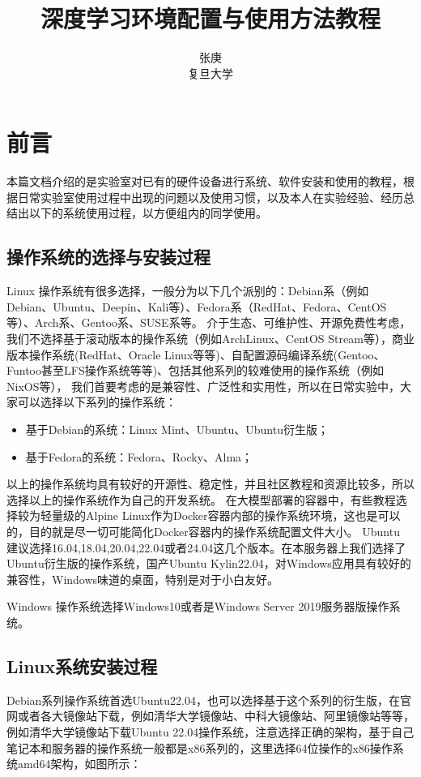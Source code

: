 \documentclass[lang=cn,a4paper,newtx]{elegantpaper}
\title{深度学习环境配置与使用方法教程}
\author{张庚 \\ 复旦大学}
\institute{知识工场实验室}
\date{\zhdate{2023/12/24}}
\begin{document}
\maketitle

\tableofcontents
\newpage

\section{前言}
本篇文档介绍的是实验室对已有的硬件设备进行系统、软件安装和使用的教程，根据日常实验室使用过程中出现的问题以及使用习惯，以及本人在实验经验、经历总结出以下的系统使用过程，以方便组内的同学使用。

\subsection{操作系统的选择与安装过程}
Linux 操作系统有很多选择，一般分为以下几个派别的：Debian系（例如Debian、Ubuntu、Deepin、Kali等）、Fedora系（RedHat、Fedora、CentOS等）、Arch系、Gentoo系、SUSE系等。
介于生态、可维护性、开源免费性考虑，我们不选择基于滚动版本的操作系统（例如ArchLinux、CentOS Stream等），商业版本操作系统(RedHat、Oracle Linux等等)、自配置源码编译系统(Gentoo、Funtoo甚至LFS操作系统等等)、包括其他系列的较难使用的操作系统（例如NixOS等），
我们首要考虑的是兼容性、广泛性和实用性，所以在日常实验中，大家可以选择以下系列的操作系统：
\begin{itemize}
  \item 基于Debian的系统：Linux Mint、Ubuntu、Ubuntu衍生版；
  \item 基于Fedora的系统：Fedora、Rocky、Alma；
\end{itemize}


以上的操作系统均具有较好的开源性、稳定性，并且社区教程和资源比较多，所以选择以上的操作系统作为自己的开发系统。
在大模型部署的容器中，有些教程选择较为轻量级的Alpine Linux作为Docker容器内部的操作系统环境，这也是可以的，目的就是尽一切可能简化Docker容器内的操作系统配置文件大小。
Ubuntu 建议选择16.04,18.04,20.04,22.04或者24.04这几个版本。在本服务器上我们选择了Ubuntu衍生版的操作系统，国产Ubuntu Kylin22.04，对Windows应用具有较好的兼容性，Windows味道的桌面，特别是对于小白友好。

Windows 操作系统选择Windows10或者是Windows Server 2019服务器版操作系统。

\subsection{Linux系统安装过程}

Debian系列操作系统首选Ubuntu22.04，也可以选择基于这个系列的衍生版，在官网或者各大镜像站下载，例如清华大学镜像站、中科大镜像站、阿里镜像站等等，
例如清华大学镜像站下载Ubuntu 22.04操作系统，注意选择正确的架构，基于自己笔记本和服务器的操作系统一般都是x86系列的，这里选择64位操作的x86操作系统amd64架构，如图所示：
\end{document}
